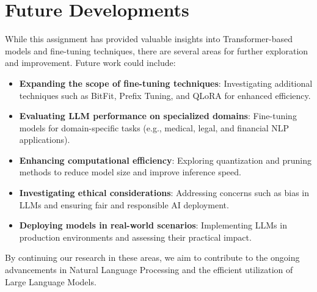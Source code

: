 \section{Future Developments}

While this assignment has provided valuable insights into Transformer-based models and fine-tuning techniques, there are several areas for further exploration and improvement. Future work could include:

\begin{itemize}
    \item \textbf{Expanding the scope of fine-tuning techniques}: Investigating additional techniques such as BitFit, Prefix Tuning, and QLoRA for enhanced efficiency.
    \item \textbf{Evaluating LLM performance on specialized domains}: Fine-tuning models for domain-specific tasks (e.g., medical, legal, and financial NLP applications).
    \item \textbf{Enhancing computational efficiency}: Exploring quantization and pruning methods to reduce model size and improve inference speed.
    \item \textbf{Investigating ethical considerations}: Addressing concerns such as bias in LLMs and ensuring fair and responsible AI deployment.
    \item \textbf{Deploying models in real-world scenarios}: Implementing LLMs in production environments and assessing their practical impact.
\end{itemize}

By continuing our research in these areas, we aim to contribute to the ongoing advancements in Natural Language Processing and the efficient utilization of Large Language Models.
